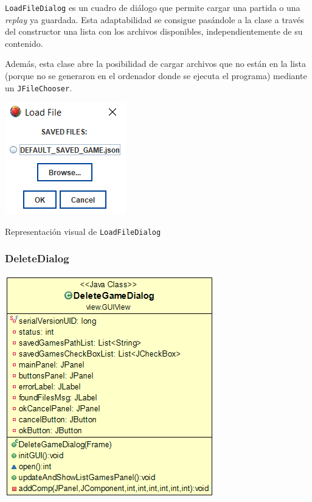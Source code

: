 \documentclass[../DocumentoOficial.tex]{subfiles}
\begin{document}
\texttt{LoadFileDialog} es un cuadro de diálogo que permite cargar una partida o una \textit{replay} ya guardada. Esta adaptabilidad se consigue pasándole a la clase a través del constructor una lista con los archivos disponibles, independientemente de su contenido.

Además, esta clase abre la posibilidad de cargar archivos que no están en la lista (porque no se generaron en el ordenador donde se ejecuta el programa) mediante un \texttt{JFileChooser}.

\begin{center}
\includegraphics[scale=1]{load-game-sprint-6.png}

Representación visual de \texttt{LoadFileDialog}
\end{center}

\newpage

\subsubsection{DeleteDialog}
\begin{center}
\includegraphics[scale=0.6]{deletedialog.png}
\end{center}
\end{document}
